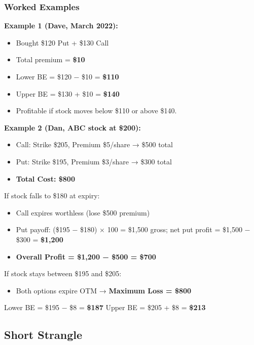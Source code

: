 \documentclass[12pt,openany]{book}
\begin{document}
\subsubsection{Worked Examples}

\textbf{Example 1 (Dave, March 2022):}
\begin{itemize}[leftmargin=*]
    \item Bought \$120 Put + \$130 Call
    \item Total premium = \textbf{\$10}
    \item Lower BE = \$120 − \$10 = \textbf{\$110}
    \item Upper BE = \$130 + \$10 = \textbf{\$140}
    \item Profitable if stock moves below \$110 or above \$140.
\end{itemize}

\textbf{Example 2 (Dan, ABC stock at \$200):}
\begin{itemize}[leftmargin=*]
    \item Call: Strike \$205, Premium \$5/share → \$500 total
    \item Put: Strike \$195, Premium \$3/share → \$300 total
    \item \textbf{Total Cost: \$800}
\end{itemize}

If stock falls to \$180 at expiry:
\begin{itemize}[leftmargin=*]
    \item Call expires worthless (lose \$500 premium)
    \item Put payoff: (\$195 − \$180) × 100 = \$1,500 gross; net put profit = \$1,500 − \$300 = \textbf{\$1,200}
    \item \textbf{Overall Profit = \$1,200 − \$500 = \$700}
\end{itemize}

If stock stays between \$195 and \$205:
\begin{itemize}[leftmargin=*]
    \item Both options expire OTM → \textbf{Maximum Loss = \$800}
\end{itemize}

Lower BE = \$195 − \$8 = \textbf{\$187}
Upper BE = \$205 + \$8 = \textbf{\$213}



\subsection{Short Strangle}
\end{document}
